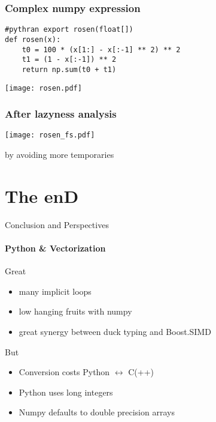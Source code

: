 \documentclass[serif]{beamer} %
\begin{document}
\begin{frame}[fragile]
    \frametitle{Complex numpy expression}
\begin{lstlisting}
#pythran export rosen(float[])
def rosen(x):
    t0 = 100 * (x[1:] - x[:-1] ** 2) ** 2
    t1 = (1 - x[:-1]) ** 2
    return np.sum(t0 + t1)
\end{lstlisting}
\texttt{[image: rosen.pdf]}
\end{frame}
\begin{frame}[fragile]
    \frametitle{After lazyness analysis}
\texttt{[image: rosen\_fs.pdf]}

 by avoiding more temporaries
\end{frame}

\section{The enD}

\begin{frame}{Conclusion and Perspectives}
    \framesubtitle{Python \& Vectorization}
    \begin{block}{\smiley{} Great \smiley{}}
        \begin{itemize}
            \item many implicit loops
            \item low hanging fruits with numpy
            \item great synergy between duck typing and Boost.SIMD
        \end{itemize}
    \end{block}
    \begin{block}{\frownie{} But \frownie{}}
        \begin{itemize}
            \item Conversion costs Python $\leftrightarrow$ C(++)
            \item Python uses \alert{long} integers
            \item Numpy defaults to \alert{double precision} arrays
        \end{itemize}
    \end{block}
\end{frame}
\end{document}
